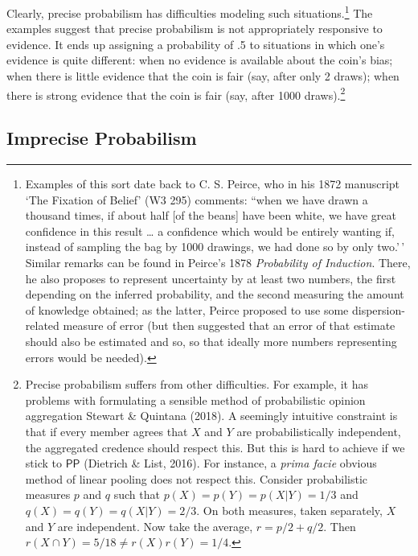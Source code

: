 \documentclass[
  10pt,
  dvipsnames,enabledeprecatedfontcommands]{scrartcl}
\newcommand{\s}[1]{\mbox{$\mathsf{#1}$}}
\begin{document}
\noindent Clearly, precise probabilism has difficulties modeling such
situations.\footnote{Examples of this sort date back to C. S. Peirce,
  who in his 1872 manuscript `The Fixation of Belief' (W3 295) comments:
  ``when we have drawn a thousand times, if about half {[}of the
  beans{]} have been white, we have great confidence in this result
  \ldots{} a confidence which would be entirely wanting if, instead of
  sampling the bag by 1000 drawings, we had done so by only two.'\,'
  Similar remarks can be found in Peirce's 1878
  \emph{Probability of Induction}. There, he also proposes to represent
  uncertainty by at least two numbers, the first depending on the
  inferred probability, and the second measuring the amount of knowledge
  obtained; as the latter, Peirce proposed to use some
  dispersion-related measure of error (but then suggested that an error
  of that estimate should also be estimated and so, so that ideally more
  numbers representing errors would be needed).} The examples suggest
that precise probabilism is not appropriately responsive to evidence. It
ends up assigning a probability of .5 to situations in which one's
evidence is quite different: when no evidence is available about the
coin's bias; when there is little evidence that the coin is fair (say,
after only 2 draws); when there is strong evidence that the coin is fair
(say, after 1000 draws).\footnote{Precise probabilism suffers from other
  difficulties. For example, it has problems with formulating a sensible
  method of probabilistic opinion aggregation Stewart \& Quintana
  (2018). A seemingly intuitive constraint is that if every member
  agrees that \(X\) and \(Y\) are probabilistically independent, the
  aggregated credence should respect this. But this is hard to achieve
  if we stick to \s{PP} (Dietrich \& List, 2016). For instance, a
  \emph{prima facie} obvious method of linear pooling does not respect
  this. Consider probabilistic measures \(p\) and \(q\) such that
  \(p(X) = p(Y) = p(X\vert Y) = 1/3\) and
  \(q(X) = q(Y) = q(X\vert Y) = 2/3\). On both measures, taken
  separately, \(X\) and \(Y\) are independent. Now take the average,
  \(r=p/2+q/2\). Then \(r(X\cap Y) = 5/18 \neq r(X)r(Y)=1/4\).}

\hypertarget{imprecise-probabilism}{%
\subsection{Imprecise Probabilism}\label{imprecise-probabilism}}
\end{document}
